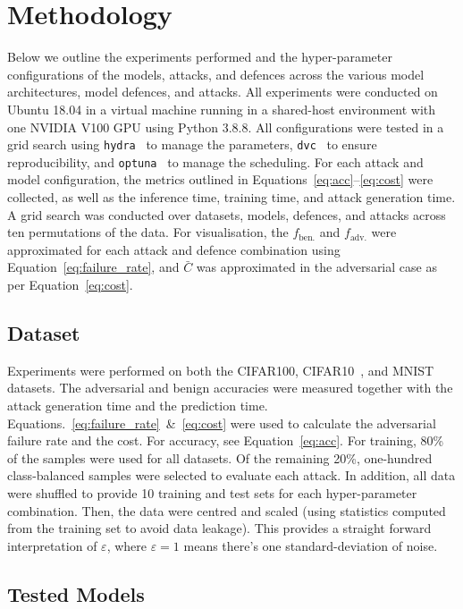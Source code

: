 \section{Methodology}
\label{methods}
Below we outline the experiments performed and the hyper-parameter configurations of the models, attacks, and defences across the various model architectures, model defences, and attacks. All experiments were conducted on Ubuntu 18.04 in a virtual machine running in a shared-host environment with one NVIDIA V100 GPU using Python 3.8.8. All configurations were tested in a grid search using \texttt{hydra}~\cite{hydra} to manage the parameters, \texttt{dvc}~\cite{dvc} to ensure reproducibility, and \texttt{optuna}~\cite{optuna} to manage the scheduling. For each attack and model configuration, the metrics outlined in Equations~\ref{eq:acc}--\ref{eq:cost} were collected, as well as the inference time, training time, and attack generation time. A grid search was conducted over datasets, models, defences, and attacks across ten permutations of the data. For visualisation, the $f_{\mathrm{ben.}}$ and $f_{\mathrm{adv.}}$ were approximated for each attack and defence combination using Equation~\ref{eq:failure_rate}, and $\bar{C}$ was approximated in the adversarial case as per Equation~\ref{eq:cost}.



\subsection{Dataset}
\label{dataset}

Experiments were performed on both the CIFAR100, CIFAR10~\cite{cifar}, and MNIST~\cite{mnist} datasets. The adversarial and benign accuracies were measured together with the attack generation time and the prediction time. Equations.~\ref{eq:failure_rate}~\&~\ref{eq:cost} were used to calculate the adversarial failure rate and the cost. For accuracy, see Equation~\ref{eq:acc}. For training, 80\% of the samples were used for all datasets. Of the remaining 20\%, one-hundred class-balanced samples were selected to evaluate each attack. In addition, all data were shuffled to provide 10 training and test sets for each hyper-parameter combination. Then, the data were centred and scaled (using statistics computed from the training set to avoid data leakage). This provides a straight forward interpretation of $\varepsilon$, where $\varepsilon = 1$ means there's one standard-deviation of noise.


\subsection{Tested Models}
\label{models}

